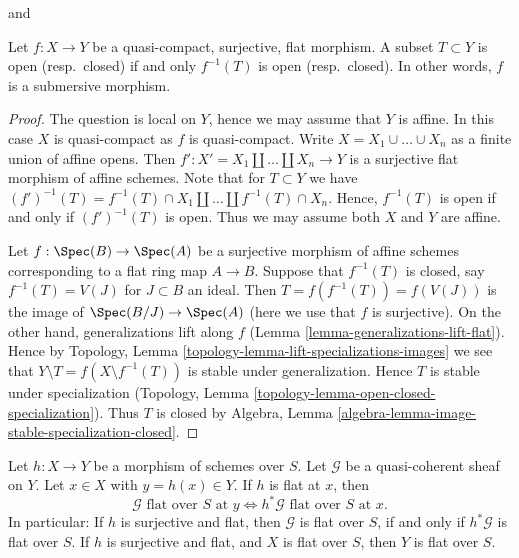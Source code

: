 \begin{lemma}
\label{lemma-fpqc-quotient-topology}
\begin{reference}
\cite[Expose VIII, Corollaire 4.3]{SGA1} and
\cite[IV, Corollaire 2.3.12]{EGA}
\end{reference}
Let $f : X \to Y$ be a quasi-compact, surjective, flat morphism.
A subset $T \subset Y$ is open (resp.\ closed) if and only
$f^{-1}(T)$ is open (resp.\ closed). In other words, $f$ is
a submersive morphism.
\end{lemma}

\begin{proof}
The question is local on $Y$, hence we may assume that $Y$ is affine.
In this case $X$ is quasi-compact as $f$ is quasi-compact.
Write $X = X_1 \cup \ldots \cup X_n$ as a finite union of affine opens.
Then $f' : X' = X_1 \amalg \ldots \amalg X_n \to Y$ is a surjective
flat morphism of affine schemes. Note that for $T \subset Y$ we have
$(f')^{-1}(T) = f^{-1}(T) \cap X_1 \amalg \ldots \amalg f^{-1}(T) \cap X_n$.
Hence, $f^{-1}(T)$ is open if and only if $(f')^{-1}(T)$ is open.
Thus we may assume both $X$ and $Y$ are affine.

\medskip\noindent
Let $f : \Spec(B) \to \Spec(A)$ be a surjective morphism of affine schemes
corresponding to a flat ring map $A \to B$. Suppose that $f^{-1}(T)$ is
closed, say $f^{-1}(T) = V(J)$ for $J \subset B$ an ideal. Then
$T = f(f^{-1}(T)) = f(V(J))$ is the image of $\Spec(B/J) \to \Spec(A)$
(here we use that $f$ is surjective). On the other hand, generalizations
lift along $f$ (Lemma \ref{lemma-generalizations-lift-flat}).
Hence by Topology, Lemma \ref{topology-lemma-lift-specializations-images}
we see that $Y \setminus T = f(X \setminus f^{-1}(T))$ is stable under
generalization. Hence $T$ is stable under specialization
(Topology, Lemma \ref{topology-lemma-open-closed-specialization}).
Thus $T$ is closed by
Algebra, Lemma \ref{algebra-lemma-image-stable-specialization-closed}.
\end{proof}

\begin{lemma}
\label{lemma-flat-permanence}
Let $h : X \to Y$ be a morphism of schemes over $S$.
Let $\mathcal{G}$ be a quasi-coherent sheaf on $Y$.
Let $x \in X$ with $y = h(x) \in Y$. If $h$ is flat at $x$, then
$$
\mathcal{G}\text{ flat over }S\text{ at }y
\Leftrightarrow
h^*\mathcal{G}\text{ flat over }S\text{ at }x.
$$
In particular: If $h$ is surjective and flat, then
$\mathcal{G}$ is flat over $S$, if and only if
$h^*\mathcal{G}$ is flat over $S$. If $h$ is surjective and
flat, and $X$ is flat over $S$, then $Y$ is flat over $S$.
\end{lemma}

